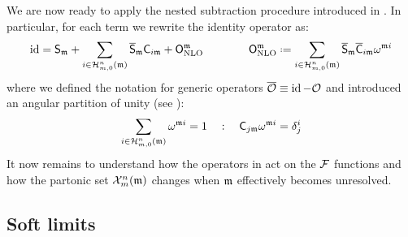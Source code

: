 
We are now ready to apply the nested subtraction procedure introduced in \cite{rontsch-2017}. In particular, for each term we rewrite the identity operator as:
\begin{equation}
  \id = \so_\ur + \sum_{i \in \prt{n}{m}(\ur)} \oso_\ur \co_{i\ur} + \nlo^\ur
  \qquad \qquad
  \nlo^\ur \defeq \sum_{i \in \prt{n}{m}(\ur)} \oso_\ur \oco_{i\ur} \omega^{\ur i}
  \label{eq:nest-sub}
\end{equation}
where we defined the notation for generic operators $ \overline{\mathcal{O}} \equiv \operatorname{id} - \mathcal{O} $ and introduced an angular partition of unity (see ):
\begin{equation}
  \sum_{i \in \mathcal{H}^{n}_{m,0}(\mathfrak{m})} \omega^{\mathfrak{m} i} = 1
  \quad : \quad
  \mathsf{C}_{j\mathfrak{m}} \omega^{\mathfrak{m} i} = \delta_j^i
  \label{eq:omega-part}
\end{equation}
It now remains to understand how the operators in  act on the $ \mathcal{F} $ functions and how the partonic set $ \mathcal{X}^{n}_{m}(\mathfrak{m}) $ changes when $ \mathfrak{m} $ effectively becomes unresolved.

\subsection{Soft limits}
\label{ssec:soft-massless}

